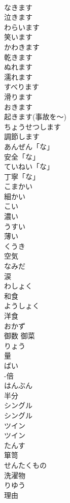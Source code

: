 \documentclass[8pt]{extreport}
\begin{document}
\begin{CJK}{UTF8}{min}
\\	なきます	
\\	泣きます	
\\	わらいます	
\\	笑います	
\\	かわきます	
\\	乾きます	
\\	ぬれます	
\\	濡れます		
\\	すべります	
\\	滑ります		
\\	おきます	
\\	起きます(事故を～)	
\\	ちょうせつします	
\\	調節します	
\\	あんぜん「な」	
\\	安全「な」	
\\	ていねい「な」	
\\	丁寧「な」	
\\	こまかい	
\\	細かい	
\\	こい	
\\	濃い	
\\	うすい	
\\	薄い	
\\	くうき	
\\	空気	
\\	なみだ	
\\	涙	
\\	わしょく	
\\	和食	
\\	ようしょく	
\\	洋食		
\\	おかず	
\\	御数 御菜	
\\	りょう	
\\	量	
\\	ばい	
\\	-倍		
\\	はんぶん	
\\	半分		
\\	シングル	
\\	シングル		
\\	ツイン	
\\	ツイン		
\\	たんす	
\\	箪笥		
\\	せんたくもの	
\\	洗濯物		
\\	りゆう	
\\	理由	

\end{CJK}
\end{document}
